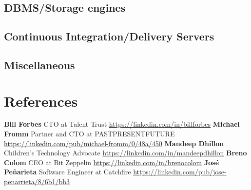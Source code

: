 \documentclass[11pt,a4paper,english]{moderncv}
\begin{document}
\subsection{DBMS/Storage engines}

\subsection{}

\subsection{Continuous Integration/Delivery Servers}


\subsection{Miscellaneous}

\subsection{}

\section{References}
\cvlistitem
{
    \textbf{Bill Forbes}
    \newline{}
    CTO at Talent Trust
    \newline{}
    \url{https://linkedin.com/in/billforbes}
}
\cvlistitem
{
    \textbf{Michael Fromm}
    \newline{}
    Partner and CTO at PASTPRESENTFUTURE
    \newline{}
    \url{https://linkedin.com/pub/michael-fromm/0/48a/450}
}
\cvlistitem
{
    \textbf{Mandeep Dhillon}
    \newline{}
    Children's Technology Advocate 
    \newline{}
    \url{https://linkedin.com/in/mandeepdhillon}
}
\cvlistitem
{
    \textbf{Breno Colom}
    \newline{}
    CEO at Bit Zeppelin
    \newline{}
    \url{https://linkedin.com/in/brenocolom}
}
\cvlistitem
{
    \textbf{José Peñarieta}
    \newline{}
    Software Engineer at Catchfire
    \newline{}
    \url{https://linkedin.com/pub/jose-penarrieta/8/6b1/bb3}
}
\end{document}
